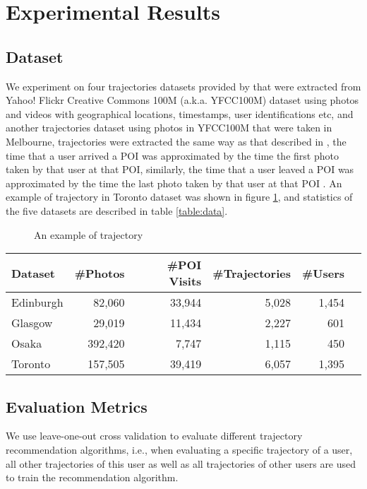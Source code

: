 \section{Experimental Results}
\label{experiment}

\subsection{Dataset}
\label{experiment:dataset}
We experiment on four trajectories datasets provided by \cite{ijcai15} that were
extracted from Yahoo! Flickr Creative Commons 100M (a.k.a. YFCC100M) dataset\cite{yfcc100m} 
using photos and videos with geographical locations, timestamps, user identifications etc,
and another trajectories dataset using photos in YFCC100M that were taken in Melbourne,
trajectories were extracted the same way as that described in \cite{ht10, ijcai15},
the time that a user arrived a POI was approximated by the time the first photo taken by that user at that POI,
similarly, the time that a user leaved a POI was approximated by the time the last photo taken by that user at 
that POI \cite{ijcai15}.
An example of trajectory in Toronto dataset was shown in figure \ref{fig:traj}, 
and statistics of the five datasets are described in table \ref{table:data}.


\begin{figure}
\centering
{}
\caption{An example of trajectory}
\label{fig:traj}
\end{figure}

\begin{table*}
\centering
\begin{tabular}{lrrrrr} \hline
\textbf{Dataset} & \textbf{\#Photos} & \textbf{\#POI Visits} & \textbf{\#Trajectories} & \textbf{\#Users} \\ \hline
Edinburgh & 82,060 & 33,944 & 5,028 & 1,454 \\ 
Glasgow & 29,019 & 11,434 & 2,227 & 601 \\ 
Osaka & 392,420 & 7,747 & 1,115 & 450 \\ 
Toronto & 157,505 & 39,419 & 6,057 & 1,395 \\ 
\hline
\end{tabular}
\caption{Statistics of trajectory dataset}
\label{table:data}
\end{table*}


\subsection{Evaluation Metrics}
\label{experiment:metric}
We use leave-one-out cross validation to evaluate different trajectory recommendation algorithms,
i.e., when evaluating a specific trajectory of a user, all other trajectories of this user as well as 
all trajectories of other users are used to train the recommendation algorithm.

